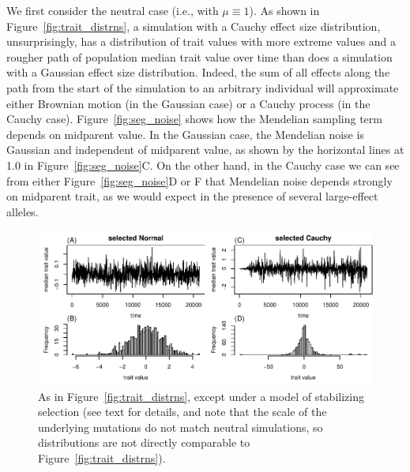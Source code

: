 \documentclass{article}
\newcommand{\1}{\mathbbm{1}}
\theoremstyle{remark}
\theoremstyle{definition}
\begin{document}
We first consider the neutral case (i.e., with $\mu \equiv 1$).
As shown in Figure~\ref{fig:trait_distrns},
a simulation with a Cauchy effect size distribution, unsurprisingly,
has a distribution of trait values with more extreme values
and a rougher path of population median trait value over time
than does a simulation with a Gaussian effect size distribution.
Indeed, the sum of all effects along the path from the start of the simulation
to an arbitrary individual will approximate either Brownian motion (in the Gaussian case)
or a Cauchy process (in the Cauchy case).
Figure~\ref{fig:seg_noise} shows how the Mendelian sampling term
depends on midparent value.
In the Gaussian case, the Mendelian noise is Gaussian and independent of midparent value,
as shown by the horizontal lines at 1.0 in Figure~\ref{fig:seg_noise}C. 
On the other hand, in the Cauchy case we can see from either Figure~\ref{fig:seg_noise}D or F
that Mendelian noise depends strongly on midparent trait,
as we would expect in the presence of several large-effect alleles.

\begin{figure}
    \begin{center}
        \includegraphics{sims/selected_trait_traces}
    \end{center}
    \caption{
        As in Figure~\ref{fig:trait_distrns},
        except under a model of stabilizing selection
        (see text for details,
        and note that the scale of the underlying mutations do not match
        neutral simulations, so distributions are not directly comparable
        to Figure~\ref{fig:trait_distrns}).
        \label{fig:sel_trait_distrns}
    }
\end{figure}
\end{document}
